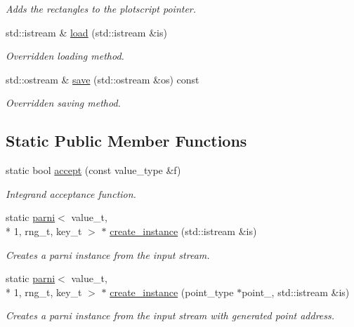 \begin{DoxyCompactItemize}
\begin{DoxyCompactList}\small\item\em Adds the rectangles to the plotscript pointer. \end{DoxyCompactList}\item 
\hypertarget{a00385_a72f1fb0acdf47ec224396042c34bab07}{std\-::istream \& \hyperlink{a00385_a72f1fb0acdf47ec224396042c34bab07}{load} (std\-::istream \&is)}\label{a00385_a72f1fb0acdf47ec224396042c34bab07}

\begin{DoxyCompactList}\small\item\em Overridden loading method. \end{DoxyCompactList}\item 
\hypertarget{a00385_aa4cb8b0f76ef1dddc0d32189b219a224}{std\-::ostream \& \hyperlink{a00385_aa4cb8b0f76ef1dddc0d32189b219a224}{save} (std\-::ostream \&os) const }\label{a00385_aa4cb8b0f76ef1dddc0d32189b219a224}

\begin{DoxyCompactList}\small\item\em Overridden saving method. \end{DoxyCompactList}\end{DoxyCompactItemize}
\subsection*{Static Public Member Functions}
\begin{DoxyCompactItemize}
\item 
\hypertarget{a00385_a403f673708d829862359816162f39c06}{static bool \hyperlink{a00385_a403f673708d829862359816162f39c06}{accept} (const value\-\_\-type \&f)}\label{a00385_a403f673708d829862359816162f39c06}

\begin{DoxyCompactList}\small\item\em Integrand acceptance function. \end{DoxyCompactList}\item 
\hypertarget{a00385_a777d762a07d99e3fe38a061711948f28}{static \hyperlink{a00384}{parni}$<$ value\-\_\-t, \\*
1, rng\-\_\-t, key\-\_\-t $>$ $\ast$ \hyperlink{a00385_a777d762a07d99e3fe38a061711948f28}{create\-\_\-instance} (std\-::istream \&is)}\label{a00385_a777d762a07d99e3fe38a061711948f28}

\begin{DoxyCompactList}\small\item\em Creates a parni instance from the input stream. \end{DoxyCompactList}\item 
static \hyperlink{a00384}{parni}$<$ value\-\_\-t, \\*
1, rng\-\_\-t, key\-\_\-t $>$ $\ast$ \hyperlink{a00385_a358c0c2adcd5ab0ce752a0c2d317e0f4}{create\-\_\-instance} (point\-\_\-type $\ast$point\-\_\-, std\-::istream \&is)
\begin{DoxyCompactList}\small\item\em Creates a parni instance from the input stream with generated point address. \end{DoxyCompactList}\end{DoxyCompactItemize}
